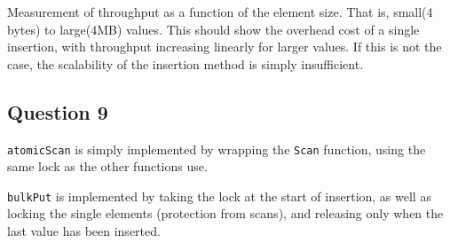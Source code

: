 \documentclass[11pt,a4paper]{article}
\begin{document}
Measurement of throughput as a function of the element size. That is, small(4 bytes) to large(4MB)
values. This should show the overhead cost of a single insertion, with throughput increasing
linearly for larger values. If this is not the case, the scalability of the insertion method
is simply insufficient.


\subsection{Question 9}
{\tt atomicScan} is simply implemented by wrapping the {\tt Scan} function,
using the same lock as the other functions use.

{\tt bulkPut} is implemented by taking the lock at the start of insertion, as
well as locking the single elements (protection from scans), and releasing only
when the last value has been inserted.
\end{document}
